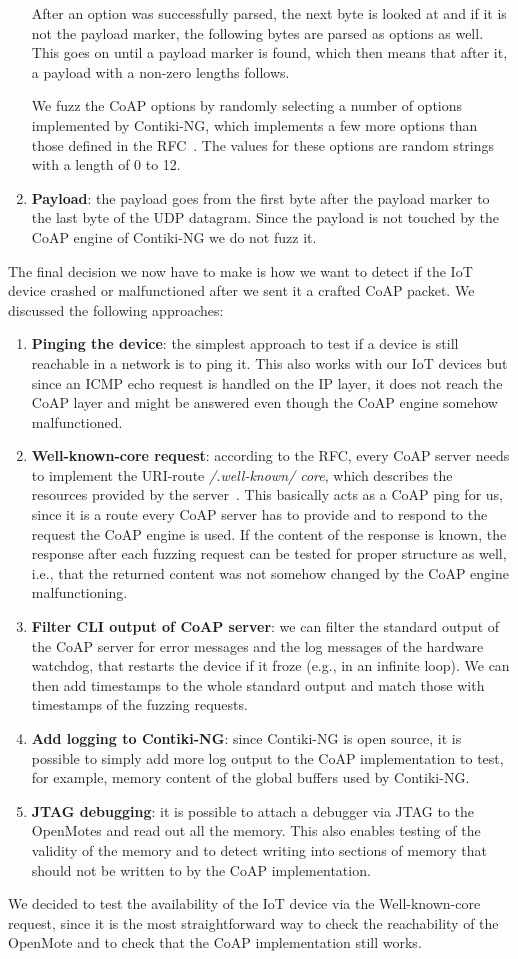 \begin{enumerate}
	After an option was successfully parsed, the next byte is looked at and if it is not the payload marker, the following bytes are parsed as options as well. This goes on until a payload marker is found, which then means that after it, a payload with a non-zero lengths follows.

	We fuzz the CoAP options by randomly selecting a number of options implemented by Contiki-NG, which implements a few more options than those defined in the RFC~\cite{RFC7252}. The values for these options are random strings with a length of 0 to 12.
	\item \textbf{Payload}: the payload goes from the first byte after the payload marker to the last byte of the UDP datagram. Since the payload is not touched by the CoAP engine of Contiki-NG we do not fuzz it.
\end{enumerate}

The final decision we now have to make is how we want to detect if the IoT device crashed or malfunctioned after we sent it a crafted CoAP packet. We discussed the following approaches:
\begin{enumerate}
	\item \textbf{Pinging the device}: the simplest approach to test if a device is still reachable in a network is to ping it. This also works with our IoT devices but since an ICMP echo request is handled on the IP layer, it does not reach the CoAP layer and might be answered even though the CoAP engine somehow malfunctioned.
	\item \textbf{Well-known-core request}: according to the RFC, every CoAP server needs to implement the URI-route \textit{/.well-known/ core}, which describes the resources provided by the server~\cite{RFC7252}. This basically acts as a CoAP ping for us, since it is a route every CoAP server has to provide and to respond to the request the CoAP engine is used. If the content of the response is known, the response after each fuzzing request can be tested for proper structure as well, i.e., that the returned content was not somehow changed by the CoAP engine malfunctioning.
	\item \textbf{Filter CLI output of CoAP server}: we can filter the standard output of the CoAP server for error messages and the log messages of the hardware watchdog, that restarts the device if it froze (e.g., in an infinite loop). We can then add timestamps to the whole standard output and match those with timestamps of the fuzzing requests.
	\item \textbf{Add logging to Contiki-NG}: since Contiki-NG is open source, it is possible to simply add more log output to the CoAP implementation to test, for example, memory content of the global buffers used by Contiki-NG.
	\item \textbf{JTAG debugging}: it is possible to attach a debugger via JTAG to the OpenMotes and read out all the memory. This also enables testing of the validity of the memory and to detect writing into sections of memory that should not be written to by the CoAP implementation.
\end{enumerate}

We decided to test the availability of the IoT device via the Well-known-core request, since it is the most straightforward way to check the reachability of the OpenMote and to check that the CoAP implementation still works.
